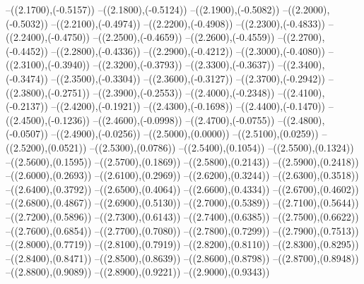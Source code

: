 {	--({\sx*(2.1700)},{\sy*(-0.5157)})
	--({\sx*(2.1800)},{\sy*(-0.5124)})
	--({\sx*(2.1900)},{\sy*(-0.5082)})
	--({\sx*(2.2000)},{\sy*(-0.5032)})
	--({\sx*(2.2100)},{\sy*(-0.4974)})
	--({\sx*(2.2200)},{\sy*(-0.4908)})
	--({\sx*(2.2300)},{\sy*(-0.4833)})
	--({\sx*(2.2400)},{\sy*(-0.4750)})
	--({\sx*(2.2500)},{\sy*(-0.4659)})
	--({\sx*(2.2600)},{\sy*(-0.4559)})
	--({\sx*(2.2700)},{\sy*(-0.4452)})
	--({\sx*(2.2800)},{\sy*(-0.4336)})
	--({\sx*(2.2900)},{\sy*(-0.4212)})
	--({\sx*(2.3000)},{\sy*(-0.4080)})
	--({\sx*(2.3100)},{\sy*(-0.3940)})
	--({\sx*(2.3200)},{\sy*(-0.3793)})
	--({\sx*(2.3300)},{\sy*(-0.3637)})
	--({\sx*(2.3400)},{\sy*(-0.3474)})
	--({\sx*(2.3500)},{\sy*(-0.3304)})
	--({\sx*(2.3600)},{\sy*(-0.3127)})
	--({\sx*(2.3700)},{\sy*(-0.2942)})
	--({\sx*(2.3800)},{\sy*(-0.2751)})
	--({\sx*(2.3900)},{\sy*(-0.2553)})
	--({\sx*(2.4000)},{\sy*(-0.2348)})
	--({\sx*(2.4100)},{\sy*(-0.2137)})
	--({\sx*(2.4200)},{\sy*(-0.1921)})
	--({\sx*(2.4300)},{\sy*(-0.1698)})
	--({\sx*(2.4400)},{\sy*(-0.1470)})
	--({\sx*(2.4500)},{\sy*(-0.1236)})
	--({\sx*(2.4600)},{\sy*(-0.0998)})
	--({\sx*(2.4700)},{\sy*(-0.0755)})
	--({\sx*(2.4800)},{\sy*(-0.0507)})
	--({\sx*(2.4900)},{\sy*(-0.0256)})
	--({\sx*(2.5000)},{\sy*(0.0000)})
	--({\sx*(2.5100)},{\sy*(0.0259)})
	--({\sx*(2.5200)},{\sy*(0.0521)})
	--({\sx*(2.5300)},{\sy*(0.0786)})
	--({\sx*(2.5400)},{\sy*(0.1054)})
	--({\sx*(2.5500)},{\sy*(0.1324)})
	--({\sx*(2.5600)},{\sy*(0.1595)})
	--({\sx*(2.5700)},{\sy*(0.1869)})
	--({\sx*(2.5800)},{\sy*(0.2143)})
	--({\sx*(2.5900)},{\sy*(0.2418)})
	--({\sx*(2.6000)},{\sy*(0.2693)})
	--({\sx*(2.6100)},{\sy*(0.2969)})
	--({\sx*(2.6200)},{\sy*(0.3244)})
	--({\sx*(2.6300)},{\sy*(0.3518)})
	--({\sx*(2.6400)},{\sy*(0.3792)})
	--({\sx*(2.6500)},{\sy*(0.4064)})
	--({\sx*(2.6600)},{\sy*(0.4334)})
	--({\sx*(2.6700)},{\sy*(0.4602)})
	--({\sx*(2.6800)},{\sy*(0.4867)})
	--({\sx*(2.6900)},{\sy*(0.5130)})
	--({\sx*(2.7000)},{\sy*(0.5389)})
	--({\sx*(2.7100)},{\sy*(0.5644)})
	--({\sx*(2.7200)},{\sy*(0.5896)})
	--({\sx*(2.7300)},{\sy*(0.6143)})
	--({\sx*(2.7400)},{\sy*(0.6385)})
	--({\sx*(2.7500)},{\sy*(0.6622)})
	--({\sx*(2.7600)},{\sy*(0.6854)})
	--({\sx*(2.7700)},{\sy*(0.7080)})
	--({\sx*(2.7800)},{\sy*(0.7299)})
	--({\sx*(2.7900)},{\sy*(0.7513)})
	--({\sx*(2.8000)},{\sy*(0.7719)})
	--({\sx*(2.8100)},{\sy*(0.7919)})
	--({\sx*(2.8200)},{\sy*(0.8110)})
	--({\sx*(2.8300)},{\sy*(0.8295)})
	--({\sx*(2.8400)},{\sy*(0.8471)})
	--({\sx*(2.8500)},{\sy*(0.8639)})
	--({\sx*(2.8600)},{\sy*(0.8798)})
	--({\sx*(2.8700)},{\sy*(0.8948)})
	--({\sx*(2.8800)},{\sy*(0.9089)})
	--({\sx*(2.8900)},{\sy*(0.9221)})
	--({\sx*(2.9000)},{\sy*(0.9343)})
}
